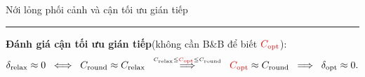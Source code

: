 \documentclass[aspectratio=169]{beamer}
\begin{document}
\begin{frame}{Nới lỏng phối cảnh và cận tối ưu gián tiếp}
    \vspace{0.2em}
    \rule{\textwidth}{0.4pt}
    \vspace{0.1em}

    \textbf{Đánh giá cận tối ưu gián tiếp}\;(không cần B\&B để biết $\textcolor{red}{C_{\mathrm{opt}}}$):
    \[
        \delta_{\mathrm{relax}}\approx 0
        \;\;\Longleftrightarrow\;\;
        C_{\mathrm{round}}\approx C_{\mathrm{relax}}
        \;\;\overset{\scriptscriptstyle C_{\mathrm{relax}}\leq\textcolor{red}{C_{\mathrm{opt}}}\leq C_{\mathrm{round}}}{\Longrightarrow}\;\;
        \textcolor{red}{C_{\mathrm{opt}}}\approx C_{\mathrm{round}}
        \;\;\Longrightarrow\;\;
        \delta_{\mathrm{opt}}\approx 0.
    \]

\end{frame}





\end{document}
